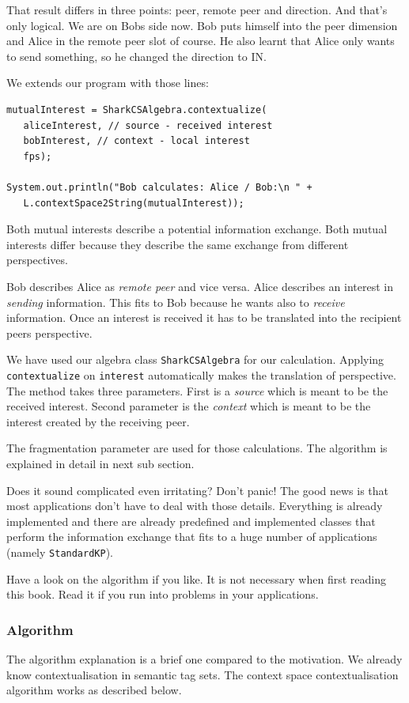 That result differs in three points: peer, remote peer and direction. And that's only logical. We are on Bobs side now. Bob puts himself into the peer dimension and Alice in the remote peer slot of course. He also learnt that Alice only wants to send something, so he changed the direction to IN.

We extends our program with those lines:
\begin{verbatim}
mutualInterest = SharkCSAlgebra.contextualize(
   aliceInterest, // source - received interest
   bobInterest, // context - local interest
   fps);

System.out.println("Bob calculates: Alice / Bob:\n " + 
   L.contextSpace2String(mutualInterest));
\end{verbatim}

Both mutual interests describe a potential information exchange. Both mutual interests differ because they describe the same exchange from different perspectives. 

Bob describes Alice as {\it remote peer} and vice versa. Alice describes an interest in {\it sending} information. This fits to Bob because he wants also to {\it receive} information. Once an interest is received it has to be translated into the recipient peers perspective.

We have used our algebra class {\tt SharkCSAlgebra} for our calculation. Applying {\tt contextualize} on {\tt interest} automatically makes the translation of perspective. The method takes three parameters. First is a {\it source} which is meant to be the received interest. Second parameter is the {\it context} which is meant to be the interest created by the receiving peer.

The fragmentation parameter are used for those calculations. The algorithm is explained in detail in next sub section.

Does it sound complicated even irritating? Don't panic! The good news is that most applications don't have to deal with those details. Everything is already implemented and there are already predefined and implemented classes that perform the information exchange that fits to a huge number of applications (namely {\tt StandardKP}). 

Have a look on the algorithm if you like. It is not necessary when first reading this book. Read it if you run into problems in your applications.

\subsubsection{Algorithm}
The algorithm explanation is a brief one compared to the motivation. We already know contextualisation in semantic tag sets. The context space contextualisation algorithm works as described below.

